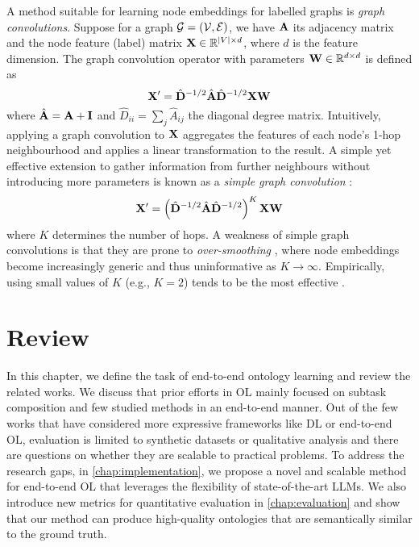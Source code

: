 A method suitable for learning node embeddings for labelled graphs is \emph{graph convolutions}. Suppose for a graph $\mathcal{G} = (\mathcal{V}, \mathcal{E})$, we have $\mathbf{A}$ its adjacency matrix and the node feature (label) matrix $\mathbf{X} \in \mathbb{R}^{|V| \times d}$, where $d$ is the feature dimension. The graph convolution operator with parameters $\mathbf{W} \in \mathbb{R}^{d \times d}$ is defined as
\[
    \mathbf{X}' = \hat{\mathbf{D}}^{-1/2} \hat{\mathbf{A}} \hat{\mathbf{D}}^{-1/2} \mathbf{X} \mathbf{W}
\]
where $\hat{\mathbf{A}} = \mathbf{A} + \mathbf{I}$ and $\hat{D}_{ii} = \sum_j \hat{A}_{ij}$ the diagonal degree matrix. Intuitively, applying a graph convolution to $\mathbf{X}$ aggregates the features of each node's 1-hop neighbourhood and applies a linear transformation to the result. A simple yet effective extension to gather information from further neighbours without introducing more parameters is known as a \emph{simple graph convolution} \cite{wu2019simplifying}:
\begin{equation}  \label{eq:simple-graph-conv}
    \mathbf{X}' = \left(\hat{\mathbf{D}}^{-1/2} \hat{\mathbf{A}} \hat{\mathbf{D}}^{-1/2}\right)^K \mathbf{X} \mathbf{W}
\end{equation}
where $K$ determines the number of hops. A weakness of simple graph convolutions is that they are prone to \emph{over-smoothing} \cite{zhu2020simple}, where node embeddings become increasingly generic and thus uninformative as $K \to \infty$. Empirically, using small values of $K$ (e.g., $K = 2$) tends to be the most effective \cite{wu2019simplifying}.

\section{Review}

In this chapter, we define the task of end-to-end ontology learning and review the related works. We discuss that prior efforts in OL mainly focused on subtask composition and few studied methods in an end-to-end manner. Out of the few works that have considered more expressive frameworks like DL or end-to-end OL, evaluation is limited to synthetic datasets or qualitative analysis and there are questions on whether they are scalable to practical problems. To address the research gaps, in \cref{chap:implementation}, we propose a novel and scalable method for end-to-end OL that leverages the flexibility of state-of-the-art LLMs. We also introduce new metrics for quantitative evaluation in \cref{chap:evaluation} and show that our method can produce high-quality ontologies that are semantically similar to the ground truth.